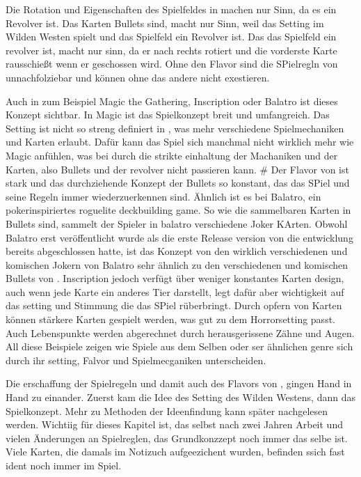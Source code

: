 Die Rotation und Eigenschaften des Spielfeldes in \FF machen nur Sinn, da es ein Revolver ist.
Das Karten Bullets sind, macht nur Sinn, weil das Setting im Wilden Westen spielt und das Spielfeld ein Revolver ist.
Das das Spielfeld ein revolver ist, macht nur sinn, da er nach rechts rotiert und die vorderste Karte rausschießt wenn er geschossen wird.
Ohne den Flavor sind die SPielregln von \FF unnachfolziebar und können ohne das andere nicht exestieren.


Auch in zum Beispiel Magic the Gathering, Inscription oder Balatro ist dieses Konzept sichtbar. In Magic ist das Spielkonzept breit und umfangreich. Das Setting ist nicht so streng definiert in \FF, was mehr verschiedene Spielmechaniken und Karten erlaubt. Dafür kann das Spiel sich manchmal nicht wirklich mehr wie Magic anfühlen,
was bei \FF durch die strikte einhaltung der Machaniken und der Karten, also  Bullets und der revolver nicht passieren kann. #
Der Flavor von \FF ist stark und das durchziehende Konzept der Bullets so konstant, das das SPiel und seine Regeln immer
wiederzuerkennen sind. Ähnlich ist es bei Balatro, ein pokerinspiriertes roguelite deckbuilding game.
So wie die sammelbaren Karten in \FF Bullets sind, sammelt der Spieler in balatro verschiedene Joker KArten.
Obwohl Balatro erst veröffentlicht wurde als die erste Release version von \FF die entwicklung bereits abgeschlossen hatte,
ist das Konzept von den wirklich verschiedenen und komischen Jokern von Balatro sehr ähnlich zu den verschiedenen und
komischen Bullets von \FF.
Inscription jedoch verfügt über weniger konstantes Karten design, auch wenn jede Karte ein anderes Tier darstellt,
legt dafür aber wichtigkeit auf das setting und Stimmung die das SPiel rüberbringt. Durch opfern von Karten können stärkere Karten
gespielt werden, was gut zu dem Horrorsetting passt. Auch Lebenspunkte werden abgerechnet durch herausgerissene Zähne und Augen.
All diese Beispiele zeigen wie Spiele aus dem Selben oder ser ähnlichen genre sich durch ihr setting, Falvor und Spielmecganiken unterscheiden.


Die erschaffung der Spielregeln und damit auch des Flavors von \FF, gingen Hand in Hand zu einander.
Zuerst kam die Idee des Setting des Wilden Westens, dann das Spielkonzept.
Mehr zu Methoden der Ideenfindung kann später nachgelesen werden. Wichtiig für dieses Kapitel ist,
das selbst nach zwei Jahren Arbeit und vielen Änderungen an Spielreglen, das Grundkonzzept noch immer das selbe ist.
Viele Karten, die damals im Notizuch aufgeezichent wurden, befinden ssich fast ident noch immer im Spiel.



